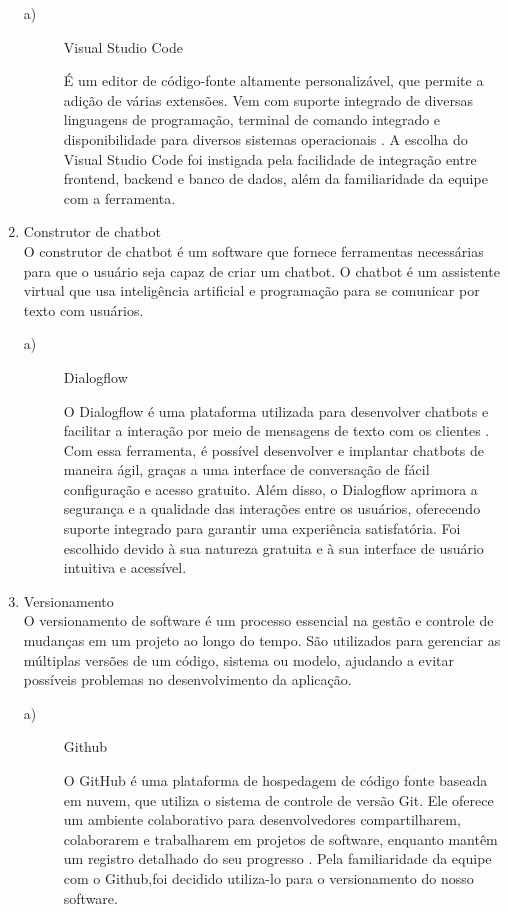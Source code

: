 \documentclass[
    article,			%
    12pt,				%
    oneside,            %
    a4paper,			%
    english,			%
    brazil,				%
    ]{abntex2}
\begin{document}
\begin{enumerate}
\begin{description}
    \item[a)] Visual Studio Code \par É um editor de código-fonte altamente personalizável, que permite a adição de várias extensões. Vem com suporte integrado de diversas linguagens de programação, terminal de comando integrado e disponibilidade para diversos sistemas operacionais \cite{VS_Code}. A escolha do Visual Studio Code foi instigada pela facilidade de integração entre frontend, backend e banco de dados, além da familiaridade da equipe com a ferramenta. \\
\end{description}

    \item Construtor de chatbot \\
        O construtor de chatbot é um software que fornece ferramentas necessárias para que o usuário seja capaz de criar um chatbot. O chatbot é um assistente virtual que usa inteligência artificial e programação para se comunicar por texto com usuários. \\
        
\begin{description}
    \item[a)] Dialogflow \par O Dialogflow é uma plataforma utilizada para desenvolver chatbots e facilitar a interação por meio de mensagens de texto com os clientes \cite{Dialogflow}. Com essa ferramenta, é possível desenvolver e implantar chatbots de maneira ágil, graças a uma interface de conversação de fácil configuração e acesso gratuito. Além disso, o Dialogflow aprimora a segurança e a qualidade das interações entre os usuários, oferecendo suporte integrado para garantir uma experiência satisfatória. Foi escolhido devido à sua natureza gratuita e à sua interface de usuário intuitiva e acessível. \\
\end{description}

    \item Versionamento \\
        O versionamento de software é um processo essencial na gestão e controle de mudanças em um projeto ao longo do tempo. São utilizados para gerenciar as múltiplas versões de um código, sistema ou modelo, ajudando a evitar possíveis problemas no desenvolvimento da aplicação. \\
        
\begin{description}
    \item[a)] Github \par O GitHub é uma plataforma de hospedagem de código fonte baseada em nuvem, que utiliza o sistema de controle de versão Git. Ele oferece um ambiente colaborativo para desenvolvedores compartilharem, colaborarem e trabalharem em projetos de software, enquanto mantêm um registro detalhado do seu progresso \cite{GitHub}. Pela familiaridade da equipe com o Github,foi decidido utiliza-lo para o versionamento do nosso software. \\
\end{description}


\end{enumerate}
\end{document}
